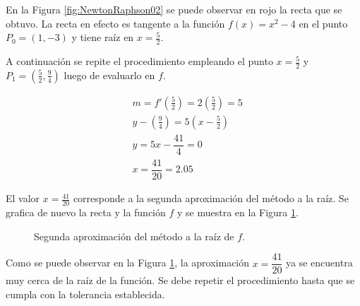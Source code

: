 \begin{exerciseT}
	En la Figura \ref{fig:NewtonRaphson02} se puede observar en rojo la recta que se obtuvo. La recta en efecto
	es tangente a la función $f(x)=x^2-4$ en el punto $P_0 = (1, -3)$ y tiene raíz en $x=\frac{5}{2}$.

	A continuación se repite el procedimiento empleando el punto $x=\frac{5}{2}$ y $P_1=(\frac{5}{2}, \frac{9}{4})$ 
	luego de evaluarlo en $f$.

	\begin{align*}
		& m = f'\left(\frac{5}{2}\right) = 2\left(\frac{5}{2}\right) = 5 \\
		& y-\left(\frac{9}{4}\right) = 5\left(x-\frac{5}{2}\right) \\
		& y = 5x - \dfrac{41}{4} = 0 \\
		& x = \dfrac{41}{20} = 2.05
	\end{align*}

	El valor $x = \frac{41}{20}$ corresponde a la segunda aproximación del método a la raíz. Se grafica de nuevo la recta 
	y la función $f$ y se muestra en la Figura \ref{fig:NewtonRaphson03}.

		\begin{figure}[H]
		\centering
		\caption{Segunda aproximación del método a la raíz de $f$.}
		\label{fig:NewtonRaphson03}
	\end{figure}

	Como se puede observar en la Figura \ref{fig:NewtonRaphson03}, la aproximación $x = \dfrac{41}{20}$ ya se encuentra
	muy cerca de la raíz de la función. Se debe repetir el procedimiento hasta que se cumpla con la tolerancia establecida.
	\label{ex:NewtonRaphson04}
\end{exerciseT}


